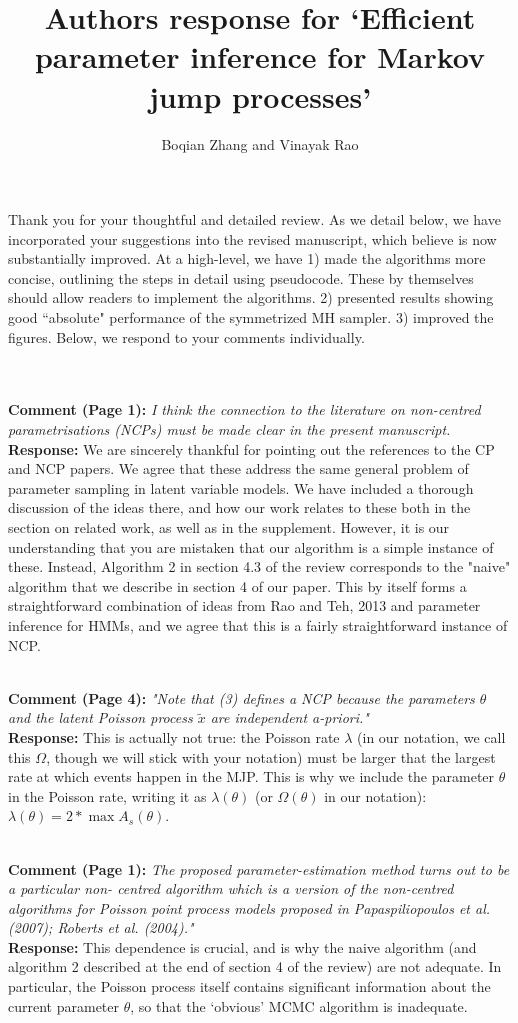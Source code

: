 \documentclass[11pt]{article}
\title{Authors response for `Efficient parameter inference for Markov jump processes'}
\author{Boqian Zhang and Vinayak Rao }
\date{}
\newcommand{\rev}[2]{\textbf{Comment #1: }\emph{#2}}
\newcommand{\resp}{\textbf{Response: }}
\begin{document}
\maketitle

Thank you for your thoughtful and detailed review. As we detail below, we have incorporated your suggestions into the revised manuscript, which believe is now substantially improved. At a high-level, we have 1) made the algorithms more concise, outlining the steps in detail using pseudocode. These by themselves should allow readers to implement the algorithms. 2) presented results showing good ``absolute" performance of the symmetrized MH sampler. 3) improved the figures.
Below, we respond to your comments individually.

~\\~\\
\rev{(Page 1)}{I think the connection to the literature on non-centred parametrisations (NCPs) must be made clear in the present manuscript.}\\ 
\resp 
We are sincerely thankful for pointing out the references to the CP and NCP papers. We agree that these address the same general problem of parameter sampling in latent variable models. We have included a thorough discussion of the ideas there, and how our work relates to these both in the section on related work, as well as in the supplement. However, it is our understanding that you are mistaken that our algorithm is a simple instance of these. Instead, Algorithm 2 in section 4.3 of the review corresponds to the "naive" algorithm that we describe in section 4 of our paper. This by itself forms a straightforward combination of ideas from Rao and Teh, 2013 and parameter inference for HMMs, and we agree that this is a fairly straightforward instance of NCP. 

~\\
\rev{(Page 4)}{"Note that (3) defines a NCP because the parameters $\theta$ and the latent Poisson process $\tilde{x}$ are independent a-priori."}\\
\resp{This is actually not true: the Poisson rate $\lambda$ (in our notation, we call this $\Omega$, though we will stick with your notation) must be larger that the largest rate at which events happen in the MJP. 
This is why we include the parameter $\theta$ in the Poisson rate, writing it as $\lambda(\theta)$ (or $\Omega(\theta)$ in our notation): 
$\lambda(\theta) = 2 * \max A_s(\theta)$.}

~\\
\rev{(Page 1)}{The proposed parameter-estimation method turns out to be a particular non- centred algorithm which is a version of the non-centred algorithms for Poisson point process models proposed in Papaspiliopoulos et al. (2007); Roberts et al.  (2004)."}\\
\resp
This dependence is crucial, and is why the naive algorithm (and algorithm 2 described at the end of section 4 of the review) are not adequate. 
In particular, the Poisson process itself contains significant information about the current parameter $\theta$, so that the `obvious' MCMC algorithm is inadequate.
\end{document}
